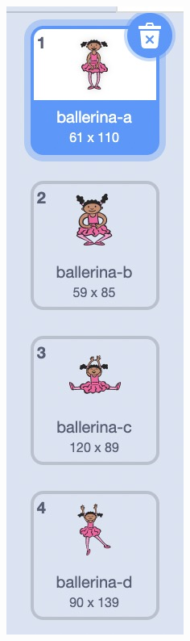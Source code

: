 \documentclass[10pt, a4paper]{article}
\begin{document}
\begin{enumerate}
\begin{figure}[htbp]
\begin{minipage}[t]{.48\textwidth}
\begin{minipage}{.28\textwidth}
                    \includegraphics[width=.6\textwidth]{8-1.jpg}
                \end{minipage}

\end{minipage}
\end{figure}
\end{enumerate}
\end{document}
